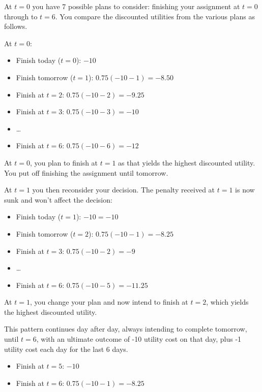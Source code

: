 \documentclass[
  letterpaper,
  DIV=11,
  numbers=noendperiod]{scrreprt}
\providecommand{\tightlist}{%
  \setlength{\itemsep}{0pt}\setlength{\parskip}{0pt}}\usepackage{longtable,booktabs,array}
\begin{document}
\begin{tcolorbox}[enhanced jigsaw, title=\textcolor{quarto-callout-tip-color}{\faLightbulb}\hspace{0.5em}{Answer}, toprule=.15mm, colback=white, breakable, titlerule=0mm, colframe=quarto-callout-tip-color-frame, coltitle=black, opacityback=0, rightrule=.15mm, colbacktitle=quarto-callout-tip-color!10!white, bottomtitle=1mm, opacitybacktitle=0.6, arc=.35mm, bottomrule=.15mm, toptitle=1mm, leftrule=.75mm, left=2mm]

At \(t=0\) you have 7 possible plans to consider: finishing your
assignment at \(t=0\) through to \(t=6\). You compare the discounted
utilities from the various plans as follows.

At \(t=0\):

\begin{itemize}
\tightlist
\item
  Finish today (\(t=0\)): \(-10\)
\item
  Finish tomorrow (\(t=1\)): \(0.75(-10-1)=-8.50\)
\item
  Finish at \(t=2\): \(0.75(-10-2)=-9.25\)
\item
  Finish at \(t=3\): \(0.75(-10-3)=-10\)
\item
  \ldots{}
\item
  Finish at \(t=6\): \(0.75(-10-6)=-12\)
\end{itemize}

At \(t=0\), you plan to finish at \(t=1\) as that yields the highest
discounted utility. You put off finishing the assignment until tomorrow.

At \(t=1\) you then reconsider your decision. The penalty received at
\(t=1\) is now sunk and won't affect the decision:

\begin{itemize}
\tightlist
\item
  Finish today (\(t=1\)): \(-10=-10\)
\item
  Finish tomorrow (\(t=2\)): \(0.75(-10-1)=-8.25\)
\item
  Finish at \(t=3\): \(0.75(-10-2)=-9\)
\item
  \ldots{}
\item
  Finish at \(t=6\): \(0.75(-10-5)=-11.25\)
\end{itemize}

At \(t=1\), you change your plan and now intend to finish at \(t=2\),
which yields the highest discounted utility.

This pattern continues day after day, always intending to complete
tomorrow, until \(t=6\), with an ultimate outcome of -10 utility cost on
that day, plus -1 utility cost each day for the last 6 days.

\begin{itemize}
\tightlist
\item
  Finish at \(t=5\): \(-10\)
\item
  Finish at \(t=6\): \(0.75(-10-1)=-8.25\)
\end{itemize}

\end{tcolorbox}
\end{document}
